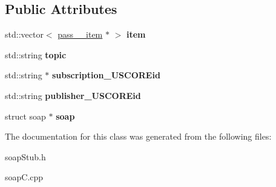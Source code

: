 \subsection*{Public Attributes}
\begin{DoxyCompactItemize}
\item 
\hypertarget{class__pass____publish_a6802dec243b3f5563b9f67ecc41c6ee5}{
std::vector$<$ \hyperlink{classpass____item}{pass\_\-\_\-item} $\ast$ $>$ {\bfseries item}}
\label{class__pass____publish_a6802dec243b3f5563b9f67ecc41c6ee5}

\item 
\hypertarget{class__pass____publish_ace32ca30b332ea6e74853ce28d986764}{
std::string {\bfseries topic}}
\label{class__pass____publish_ace32ca30b332ea6e74853ce28d986764}

\item 
\hypertarget{class__pass____publish_a8c85d090885f4e1af411f250f72c7269}{
std::string $\ast$ {\bfseries subscription\_\-USCOREid}}
\label{class__pass____publish_a8c85d090885f4e1af411f250f72c7269}

\item 
\hypertarget{class__pass____publish_a3b4f869818ea45375572401b352411aa}{
std::string {\bfseries publisher\_\-USCOREid}}
\label{class__pass____publish_a3b4f869818ea45375572401b352411aa}

\item 
\hypertarget{class__pass____publish_abab7a96ea22da044a462b1634b1731ae}{
struct soap $\ast$ {\bfseries soap}}
\label{class__pass____publish_abab7a96ea22da044a462b1634b1731ae}

\end{DoxyCompactItemize}


The documentation for this class was generated from the following files:\begin{DoxyCompactItemize}
\item 
soapStub.h\item 
soapC.cpp\end{DoxyCompactItemize}
